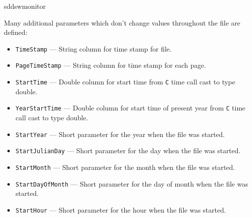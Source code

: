 \begin{sddsprog}{sddswmonitor}
\begin{itemize}
Many additional parameters which don't change values throughout the file are defined:
\begin{itemize}
        \item {\tt TimeStamp} --- String column for time stamp for file.
        \item {\tt PageTimeStamp} --- String column for time stamp for each page.
        \item {\tt StartTime} --- Double column for start time from {\tt C} time call cast to type double.
        \item {\tt YearStartTime} --- Double column for start time of present year from {\tt C}
                time call cast to type double.
        \item {\verb+StartYear+} --- Short parameter for the year when the file was started.
        \item {\verb+StartJulianDay+} --- Short parameter for the day when the file was started.
        \item {\verb+StartMonth+} --- Short parameter for the month when the file was started.
        \item {\verb+StartDayOfMonth+} --- Short parameter for the day of month when the file was started.
        \item {\verb+StartHour+} --- Short parameter for the hour when the file was started.
\end{itemize}
\end{itemize}


\end{sddsprog}
